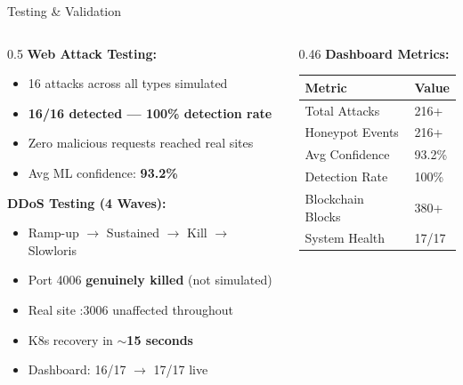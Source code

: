 \documentclass[aspectratio=169,12pt]{beamer}
\begin{document}
\begin{frame}{Testing \& Validation}
  \begin{columns}[T]
    \begin{column}{0.5\textwidth}
      \textbf{\textcolor{dcCyan}{Web Attack Testing:}}
      \begin{itemize}\small
        \item 16 attacks across all types simulated
        \item \textcolor{dcGreen}{\textbf{16/16 detected --- 100\% detection rate}}
        \item Zero malicious requests reached real sites
        \item Avg ML confidence: \textbf{93.2\%}
      \end{itemize}
      \vspace{0.3em}
      \textbf{\textcolor{dcRed}{DDoS Testing (4 Waves):}}
      \begin{itemize}\small
        \item Ramp-up $\rightarrow$ Sustained $\rightarrow$ Kill $\rightarrow$ Slowloris
        \item Port 4006 \textbf{genuinely killed} (not simulated)
        \item Real site :3006 unaffected throughout
        \item K8s recovery in \textbf{$\sim$15 seconds}
        \item Dashboard: 16/17 $\rightarrow$ 17/17 live
      \end{itemize}
    \end{column}
    \begin{column}{0.46\textwidth}
      \textbf{\textcolor{dcCyan}{Dashboard Metrics:}}\\[0.2em]
      \centering\footnotesize
      \begin{tabular}{@{} l l @{}}
        \toprule
        \rowcolor{dcMid}
        \textcolor{dcCyan}{Metric} & \textcolor{dcGreen}{Value}\\
        \midrule
        Total Attacks    & 216+\\
        \rowcolor{dcDark}
        Honeypot Events  & 216+\\
        Avg Confidence   & 93.2\%\\
        \rowcolor{dcDark}
        Detection Rate   & 100\%\\
        Blockchain Blocks& 380+\\
        \rowcolor{dcDark}
        System Health    & 17/17\\
        \bottomrule
      \end{tabular}
    \end{column}
  \end{columns}
\end{frame}
\end{document}
